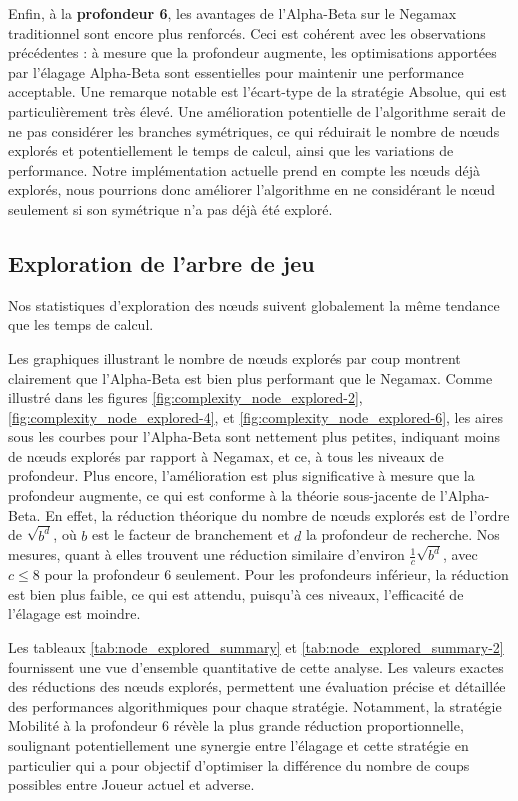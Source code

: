 Enfin, à la \textbf{profondeur 6}, les avantages de l'Alpha-Beta sur le Negamax traditionnel sont encore plus renforcés. Ceci est cohérent avec les observations précédentes : à mesure que la profondeur augmente, les optimisations apportées par l'élagage Alpha-Beta sont essentielles pour maintenir une performance acceptable. Une remarque notable est l'écart-type de la stratégie Absolue, qui est particulièrement très élevé. Une amélioration potentielle de l'algorithme serait de ne pas considérer les branches symétriques, ce qui réduirait le nombre de nœuds explorés et potentiellement le temps de calcul, ainsi que les variations de performance. Notre implémentation actuelle prend en compte les nœuds déjà explorés, nous pourrions donc améliorer l'algorithme en ne considérant le nœud seulement si son symétrique n'a pas déjà été exploré.


\subsection{Exploration de l'arbre de jeu}
Nos statistiques d'exploration des nœuds suivent globalement la même tendance que les temps de calcul.

Les graphiques illustrant le nombre de nœuds explorés par coup montrent clairement que l'Alpha-Beta est bien plus performant que le Negamax. Comme illustré dans les figures \ref{fig:complexity_node_explored-2}, \ref{fig:complexity_node_explored-4}, et \ref{fig:complexity_node_explored-6}, les aires sous les courbes pour l'Alpha-Beta sont nettement plus petites, indiquant moins de nœuds explorés par rapport à Negamax, et ce, à tous les niveaux de profondeur. Plus encore, l'amélioration est plus significative à mesure que la profondeur augmente, ce qui est conforme à la théorie sous-jacente de l'Alpha-Beta. En effet, la réduction théorique du nombre de nœuds explorés est de l'ordre de $\sqrt{b^d}$, où $b$ est le facteur de branchement et $d$ la profondeur de recherche. Nos mesures, quant à elles trouvent une réduction similaire d'environ $\frac{1}{c}\sqrt{b^d}$, avec $c\leq8$ pour la profondeur 6 seulement. Pour les profondeurs inférieur, la réduction est bien plus faible, ce qui est attendu, puisqu'à ces niveaux, l'efficacité de l'élagage est moindre.

Les tableaux \ref{tab:node_explored_summary} et \ref{tab:node_explored_summary-2} fournissent une vue d'ensemble quantitative de cette analyse. Les valeurs exactes des réductions des nœuds explorés, permettent une évaluation précise et détaillée des performances algorithmiques pour chaque stratégie. Notamment, la stratégie Mobilité à la profondeur 6 révèle la plus grande réduction proportionnelle, soulignant potentiellement une synergie entre l'élagage et cette stratégie en particulier qui a pour objectif d'optimiser la différence du nombre de coups possibles entre Joueur actuel et adverse.

